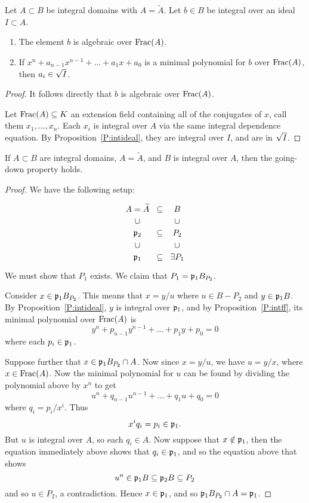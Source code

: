 \documentclass{ximera}
\begin{document}
\begin{proposition}\label{P:intff}
  Let $A\subset B$ be integral domains with $A = \tilde{A}$. Let $b\in
  B$ be integral over an ideal $I\subset A$.
  \begin{enumerate}
  \item The element $b$ is algebraic over $\operatorname{Frac}(A)$.
  \item If $x^n + a_{n-1}x^{n-1} + \dots + a_1 x + a_0$ is a minimal
    polynomial for $b$ over $\operatorname{Frac}(A)$, then $a_i\in \sqrt{I}$.
  \end{enumerate}
  \begin{proof}
    It follows directly that $b$ is algebraic over $\operatorname{Frac}(A)$.

    Let $\operatorname{Frac}(A)\subseteq K$ an extension field containing all of the
    conjugates of $x$, call them $x_1,\dots, x_n$. Each $x_i$ is
    integral over $A$ via the same integral dependence equation. By
    Proposition~\ref{P:intideal}, they are integral over $I$, and are
    in $\sqrt{I}$.
  \end{proof}
\end{proposition}


\begin{theorem}
  If $A\subset B$ are integral domains, $A=\tilde{A}$, and $B$ is
  integral over $A$, then the going-down property holds.
  \begin{proof}
    We have the following setup:
    \[
    \begin{tikzcd}[row sep=0em,column sep=0em]
      A=\tilde{A}    & \subset & B \\
      \cup &         & \cup \\
      \p_2 & \subset & P_2 \\
      \cup &         & \cup \\
      \p_1 & \subset & \exists P_1  
    \end{tikzcd}
    \]
    We must show that $P_1$ exists. We claim that $P_1 = \mathfrak{p}_1 B_{P_2}$.

    Consider $x\in \mathfrak{p}_1 B_{P_2}$. This means that $x = y/u$ where
    $u\in B-P_2$ and $y\in \mathfrak{p}_1 B$. By Proposition~\ref{P:intideal},
    $y$ is integral over $\mathfrak{p}_1$, and by Proposition~\ref{P:intff}, its
    minimal polynomial over $\operatorname{Frac}(A)$ is
    \[
    y^n + p_{n-1}y^{n-1} + \dots + p_1 y + p_0 = 0
    \]
    where each $p_i\in\mathfrak{p}_1$.

    Suppose further that $x\in \mathfrak{p}_1 B_{P_2}\cap A$. Now since $x =
    y/u$, we have $u = y/x$, where $x\in\operatorname{Frac}(A)$. Now the minimal
    polynomial for $u$ can be found by dividing the polynomial above
    by $x^n$ to get
    \[
    u^n + q_{n-1} u^{n-1} + \dots + q_1 u + q_0 = 0
    \]
    where $q_i = p_i/x^i$. Thus
    \[
    x^i q_i = p_i \in \mathfrak{p}_1.
    \]
    But $u$ is integral over $A$, so each $q_i\in A$. Now suppose that
    $x\notin\mathfrak{p}_1$, then the equation immediately above shows that
    $q_i\in\mathfrak{p}_1$, and so the equation above that shows
    \[
    u^n\in \mathfrak{p}_1 B \subseteq \mathfrak{p}_2 B \subseteq P_2
    \]
    and so $u\in P_2$, a contradiction. Hence $x\in \mathfrak{p}_1$, and so
    $\mathfrak{p}_1 B_{P_2}\cap A = \mathfrak{p}_1$.
  \end{proof}
\end{theorem}
\end{document}
